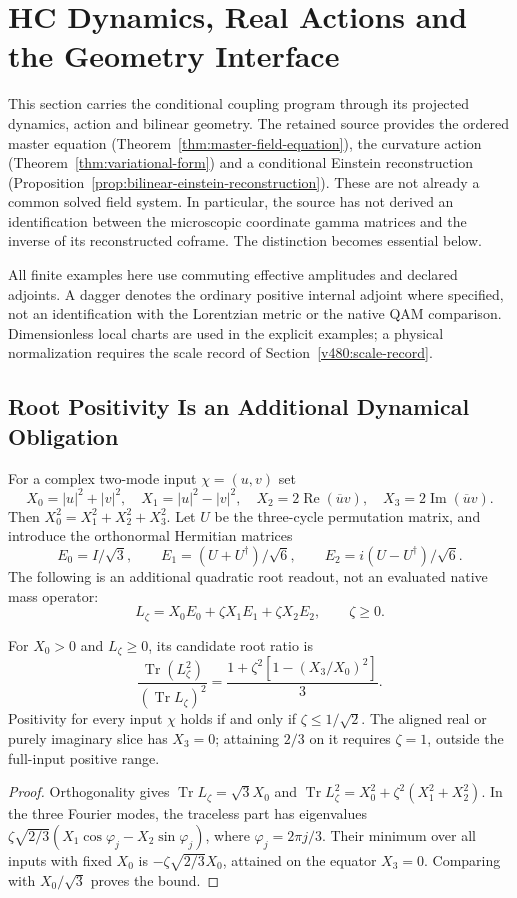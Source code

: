 \section{HC Dynamics, Real Actions and the Geometry Interface}
\label{v480:hc-dynamics-geometry}

This section carries the conditional coupling program through its
projected dynamics, action and bilinear geometry. The retained source
provides the ordered master equation
(Theorem~\ref{thm:master-field-equation}), the curvature action
(Theorem~\ref{thm:variational-form}) and a conditional Einstein
reconstruction (Proposition~\ref{prop:bilinear-einstein-reconstruction}).
These are not already a common solved field system. In particular,
the source has not derived an identification between the microscopic
coordinate gamma matrices and the inverse of its reconstructed coframe.
The distinction becomes essential below.

All finite examples here use commuting effective amplitudes and declared
adjoints. A dagger denotes the ordinary positive internal adjoint where
specified, not an identification with the Lorentzian metric or the
native QAM comparison. Dimensionless local charts are used in the
explicit examples; a physical normalization requires the scale record
of Section~\ref{v480:scale-record}.

\subsection{Root Positivity Is an Additional Dynamical Obligation}

For a complex two-mode input $\chi=(u,v)$ set
\[
 X_0=|u|^2+|v|^2,\quad X_1=|u|^2-|v|^2,\quad
 X_2=2\operatorname{Re}(\overline u v),\quad
 X_3=2\operatorname{Im}(\overline u v).
\]
Then $X_0^2=X_1^2+X_2^2+X_3^2$. Let $U$ be the three-cycle
permutation matrix, and introduce the orthonormal Hermitian matrices
\[
 E_0=I/\sqrt3,\qquad E_1=(U+U^\dagger)/\sqrt6,\qquad
 E_2=i(U-U^\dagger)/\sqrt6.
\]
The following is an additional quadratic root readout, not an evaluated
native mass operator:
\[
 L_\zeta=X_0E_0+\zeta X_1E_1+\zeta X_2E_2,\qquad \zeta\geq0.
\]

\begin{proposition}
\label{v480:hc-root-domain}
For $X_0>0$ and $L_\zeta\geq0$, its candidate root ratio is
\[
 \frac{\operatorname{Tr}(L_\zeta^2)}{(\operatorname{Tr}L_\zeta)^2}
 =\frac{1+\zeta^2[1-(X_3/X_0)^2]}3.
\]
Positivity for every input $\chi$ holds if and only if
$\zeta\leq1/\sqrt2$. The aligned real or purely imaginary slice
has $X_3=0$; attaining $2/3$ on it requires $\zeta=1$, outside
the full-input positive range.
\end{proposition}
\begin{proof}
Orthogonality gives $\operatorname{Tr}L_\zeta=\sqrt3X_0$ and
$\operatorname{Tr}L_\zeta^2=X_0^2+\zeta^2(X_1^2+X_2^2)$.
In the three Fourier modes, the traceless part has eigenvalues
$\zeta\sqrt{2/3}(X_1\cos\varphi_j-X_2\sin\varphi_j)$,
where $\varphi_j=2\pi j/3$. Their minimum over all inputs with
fixed $X_0$ is $-\zeta\sqrt{2/3}X_0$, attained on the equator
$X_3=0$. Comparing with $X_0/\sqrt3$ proves the bound.
\end{proof}

